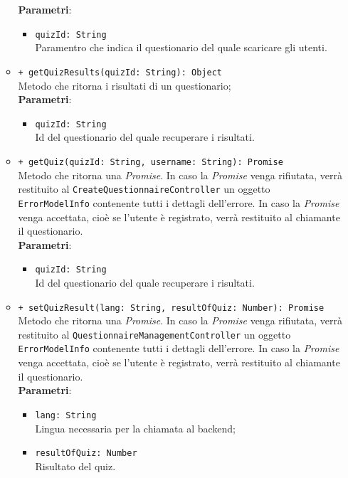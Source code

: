 \begin{itemize}
\begin{itemize}
	\textbf{Parametri}:
	\begin{itemize}
		\item \texttt{quizId: String} \\ Paramentro che indica il questionario del quale scaricare gli utenti.
	\end{itemize}
	\item \texttt{+ getQuizResults(quizId: String): Object} \\ Metodo che ritorna i risultati di un questionario; \\
	\textbf{Parametri}:
	\begin{itemize}
		\item \texttt{quizId: String} \\ Id del questionario del quale recuperare i risultati.
	\end{itemize}
	\item \texttt{+ getQuiz(quizId: String, username: String): Promise} \\ Metodo che ritorna una \textit{Promise}. In caso la \textit{Promise} venga rifiutata, verrà restituito al \texttt{CreateQuestionnaireController} un oggetto \texttt{ErrorModelInfo} contenente tutti i dettagli dell'errore. In caso la \textit{Promise} venga accettata, cioè se l'utente è registrato, verrà restituito al chiamante il questionario. \\
	\textbf{Parametri}:
	\begin{itemize}
		\item \texttt{quizId: String} \\ Id del questionario del quale recuperare i risultati.
	\end{itemize}
	\item \texttt{+ setQuizResult(lang: String, resultOfQuiz: Number): Promise} \\ Metodo che ritorna una \textit{Promise}. In caso la \textit{Promise} venga rifiutata, verrà restituito al \texttt{QuestionnaireManagementController} un oggetto \texttt{ErrorModelInfo} contenente tutti i dettagli dell'errore. In caso la \textit{Promise} venga accettata, cioè se l'utente è registrato, verrà restituito al chiamante il questionario. \\
	\textbf{Parametri}:
	\begin{itemize}
		\item \texttt{lang: String} \\ Lingua necessaria per la chiamata al backend;
		\item \texttt{resultOfQuiz: Number} \\ Risultato del quiz.

\end{itemize}
\end{itemize}
\end{itemize}
